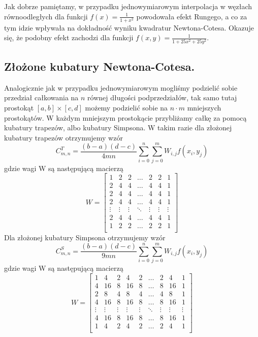 \documentclass[10pt,wide]{mwart}
\theoremstyle{definition}
\begin{document}
Jak dobrze pamiętamy, w przypadku jednowymiarowym interpolacja w węzłach równoodległych dla funkcji \(f(x) = \frac{1}{1+x^2}\) powodowała efekt Rungego,
a co za tym idzie wpływała na dokładność wyniku kwadratur Newtona-Cotesa. Okazuje się, że podobny efekt zachodzi dla funkcji \(f(x,y) = \frac{1}{1+25x^2 + 25y^2} \).


\subsection{Złożone kubatury Newtona-Cotesa.}
Analogicznie jak w przypadku jednowymiarowym mogliśmy podzielić sobie przedział całkowania na \(n\) równej długości podprzedziałów,
tak samo tutaj prostokąt \([a,b]\times [c,d]\) możemy podzielić sobie na \(n\cdot m\) mniejszych prostokątów.
W każdym mniejszym prostokącie przybliżamy całkę za pomocą kubatury trapezów, albo kubatury Simpsona.
W takim razie dla złożonej kubatury trapezów otrzymujemy wzór
\begin{equation}
  C^T_{m,n} = \frac{(b-a)(d-c)}{4mn}\sum_{i=0}^{n}\sum_{j=0}^{m}W_{i,j}f(x_i,y_j)
\end{equation}
gdzie wagi W są następującą macierzą
\begin{equation*}
  W =
\begin{bmatrix}
    1 & 2 & 2 & \dots  & 2 & 2 & 1 \\
    2 & 4 & 4 & \dots  & 4 & 4 & 1 \\
    2 & 4 & 4 & \dots  & 4 & 4 & 1 \\
    2 & 4 & 4 & \dots  & 4 & 4 & 1 \\
    \vdots & \vdots & \vdots & \ddots & \vdots & \vdots & \vdots \\
    2 & 4 & 4 & \dots  & 4 & 4 & 1 \\
    1 & 2 & 2 & \dots  & 2 & 2 & 1 \\
\end{bmatrix}
\end{equation*}
Dla złożonej kubatury Simpsona otrzymujemy wzór
\begin{equation}
  C^S_{m,n} = \frac{(b-a)(d-c)}{9mn}\sum_{i=0}^{n}\sum_{j=0}^{m}W_{i,j}f(x_i,y_j)
\end{equation}
gdzie wagi W są następującą macierzą
\begin{equation*}
  W =
\begin{bmatrix}
    1 & 4 & 2 & 4 & 2 &\dots  & 2 & 4 & 1 \\
    4 & 16 & 8 & 16 & 8 &\dots  & 8 & 16 & 1 \\
    2 & 8 & 4 & 8 & 4 &\dots  & 4 & 8 & 1 \\
    4 & 16 & 8 & 16 & 8 &\dots  & 8 & 16 & 1 \\
    \vdots & \vdots & \vdots & \vdots & \vdots &\ddots & \vdots & \vdots & \vdots \\
    4 & 16 & 8 & 16 & 8 &\dots  & 8 & 16 & 1 \\
    1 & 4 & 2 & 4 & 2 &\dots  & 2 & 4 & 1 \\
\end{bmatrix}
\end{equation*}
\end{document}
